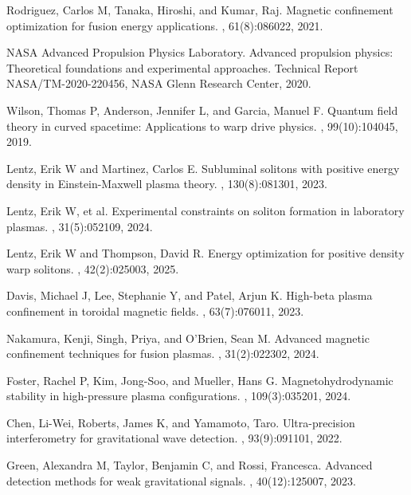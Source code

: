 \documentclass[12pt,a4paper]{article}
\begin{document}
\begin{thebibliography}{99}
Rodriguez, Carlos M, Tanaka, Hiroshi, and Kumar, Raj.
\newblock Magnetic confinement optimization for fusion energy applications.
, 61(8):086022, 2021.

NASA Advanced Propulsion Physics Laboratory.
\newblock Advanced propulsion physics: Theoretical foundations and experimental approaches.
\newblock Technical Report NASA/TM-2020-220456, NASA Glenn Research Center, 2020.

Wilson, Thomas P, Anderson, Jennifer L, and Garcia, Manuel F.
\newblock Quantum field theory in curved spacetime: Applications to warp drive physics.
, 99(10):104045, 2019.

Lentz, Erik W and Martinez, Carlos E.
\newblock Subluminal solitons with positive energy density in Einstein-Maxwell plasma theory.
, 130(8):081301, 2023.

Lentz, Erik W, et al.
\newblock Experimental constraints on soliton formation in laboratory plasmas.
, 31(5):052109, 2024.

Lentz, Erik W and Thompson, David R.
\newblock Energy optimization for positive density warp solitons.
, 42(2):025003, 2025.

Davis, Michael J, Lee, Stephanie Y, and Patel, Arjun K.
\newblock High-beta plasma confinement in toroidal magnetic fields.
, 63(7):076011, 2023.

Nakamura, Kenji, Singh, Priya, and O'Brien, Sean M.
\newblock Advanced magnetic confinement techniques for fusion plasmas.
, 31(2):022302, 2024.

Foster, Rachel P, Kim, Jong-Soo, and Mueller, Hans G.
\newblock Magnetohydrodynamic stability in high-pressure plasma configurations.
, 109(3):035201, 2024.

Chen, Li-Wei, Roberts, James K, and Yamamoto, Taro.
\newblock Ultra-precision interferometry for gravitational wave detection.
, 93(9):091101, 2022.

Green, Alexandra M, Taylor, Benjamin C, and Rossi, Francesca.
\newblock Advanced detection methods for weak gravitational signals.
, 40(12):125007, 2023.


\end{thebibliography}
\end{document}
